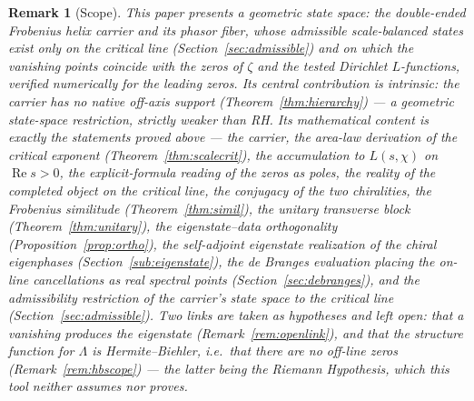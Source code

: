 \documentclass[11pt]{article}
\newtheorem{remark}[definition]{Remark}
\DeclareMathOperator{\Ree}{Re}
\begin{document}
\begin{remark}[Scope]\label{rem:scope}
This paper presents a geometric state space: the double-ended Frobenius helix carrier and its phasor
fiber, whose admissible scale-balanced states exist only on the critical line
(Section~\ref{sec:admissible}) and on which the vanishing points coincide with the zeros of $\zeta$
and the tested Dirichlet $L$-functions, verified numerically for the leading zeros. Its central
contribution is intrinsic: the carrier has \emph{no native off-axis support}
(Theorem~\ref{thm:hierarchy}) --- a geometric state-space restriction, strictly weaker than RH.
Its mathematical content is exactly the
statements proved above --- the carrier, the area-law derivation of the critical exponent
(Theorem~\ref{thm:scalecrit}), the accumulation to $L(s,\chi)$ on $\Ree s>0$, the
explicit-formula reading of the zeros as poles, the reality of the completed object on the critical
line, the conjugacy of the two chiralities, the Frobenius similitude (Theorem~\ref{thm:simil}), the
unitary transverse block (Theorem~\ref{thm:unitary}), the eigenstate--data orthogonality
(Proposition~\ref{prop:ortho}), the self-adjoint eigenstate realization of the chiral eigenphases
(Section~\ref{sub:eigenstate}), the de Branges evaluation placing the on-line cancellations as real
spectral points (Section~\ref{sec:debranges}), and the admissibility restriction of the carrier's
state space to the critical line (Section~\ref{sec:admissible}). Two links are taken as hypotheses
and left open: that a vanishing
\emph{produces} the eigenstate (Remark~\ref{rem:openlink}), and that the structure function for
$\Lambda$ is Hermite--Biehler, i.e.\ that there are no off-line zeros (Remark~\ref{rem:hbscope}) ---
the latter being the Riemann Hypothesis, which this tool neither assumes nor proves.
\end{remark}
\end{document}
